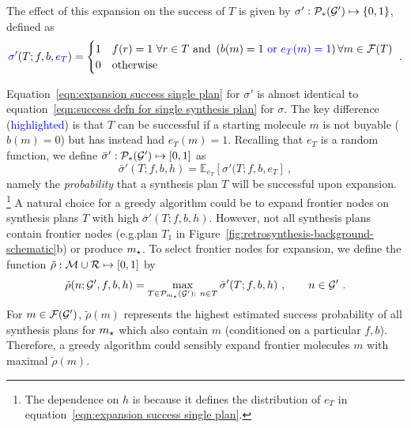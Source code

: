 The effect of this expansion on the success of $T$ is given by
$\sigma':\mathcal{P}_*({\mathcal{G}}')\mapsto\{0,1\}$,
defined as
\begin{equation}\label{eqn:expansion success single plan}
    {\color{blue} \sigma '} (T;f,b,{\color{blue}e_{T}}) =
    \begin{cases}
        1 & f(r)=1\ \forall r\in T\text{ and } \left(b(m)=1{\color{blue}\text{ or } e_{T}(m)=1}\right) \forall m\in\mathcal{F}(T) \\
        0 & \text{otherwise}
    \end{cases}\ .
\end{equation}

Equation~\ref{eqn:expansion success single plan} for $\sigma'$
is almost identical to equation~\ref{eqn:success defn for single synthesis plan} for $\sigma$.
The key difference (\textcolor{blue}{highlighted})
is that $T$ can be successful if a starting molecule $m$ is not buyable ($b(m)=0$)
but has instead had $e_{T}(m)=1$.
Recalling that $e_{T}$ is a random function,
we define
$\bar\sigma':\mathcal{P}_*({\mathcal{G}}')\mapsto[0,1]$ as
\begin{equation}\label{eqn:sigma' bar}
    \bar\sigma'(T;f,b,h) =
    \mathbb E_{e_{T}} \left[
        \sigma'(T;f,b, e_{T}
    \right]\ ,
\end{equation}
namely the \emph{probability} that a synthesis plan $T$ will be successful upon expansion.%
\footnote{
    The dependence on $h$ is because it
    defines the distribution of $e_{T}$ in equation~\ref{eqn:expansion success single plan}.
}
A natural choice for a greedy algorithm could be to expand
frontier nodes on synthesis plans $T$ with high $\bar\sigma'(T;f,b,h)$.
However, not all synthesis plans contain frontier nodes
(e.g.\@ plan $T_1$ in Figure~\ref{fig:retrosynthesis-background-schematic}b)
or produce $m_\star$.
To select frontier nodes for expansion,
we define the function $\tilde\rho:{\mathcal{M}}\cup{\mathcal{R}}\mapsto[0,1]$ by
\begin{equation}\label{eqn:rho tilde}
    \tilde\rho(n;\gG',f,b,h) = \max_{T\in\enumplans_{\targetmol}(\gG'):\ n\in T}
        \bar\sigma'(T;f,b,h)\ ,\qquad n\in\gG'\ .
\end{equation}
For $m\in\mathcal{F}({\mathcal{G}}')$,
$\tilde\rho(m)$ represents the highest estimated success probability
of all synthesis plans for $m_\star$ which also contain $m$
(conditioned on a particular $f,b$).
Therefore, a greedy algorithm could sensibly expand frontier molecules $m$ with maximal $\tilde\rho(m)$.

